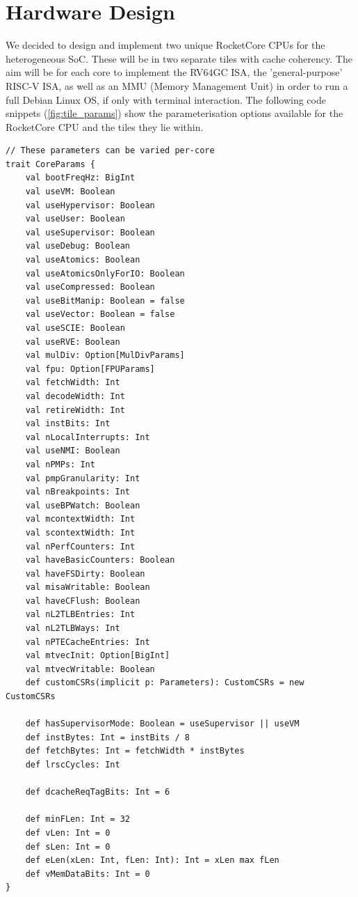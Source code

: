 \chapter{Hardware Design}
\label{ch:hw_design}
We decided to design and implement two unique RocketCore CPUs for the heterogeneous SoC. These will be in two separate tiles with cache coherency. The aim will be for each core to implement the RV64GC ISA, the 'general-purpose' RISC-V ISA, as well as an MMU (Memory Management Unit) in order to run a full Debian Linux OS, if only with terminal interaction. The following code snippets (\ref{fig:tile_params}) show the parameterisation options available for the RocketCore CPU and the tiles they lie within.

\begin{verbatim}
// These parameters can be varied per-core
trait CoreParams {
    val bootFreqHz: BigInt
    val useVM: Boolean
    val useHypervisor: Boolean
    val useUser: Boolean
    val useSupervisor: Boolean
    val useDebug: Boolean
    val useAtomics: Boolean
    val useAtomicsOnlyForIO: Boolean
    val useCompressed: Boolean
    val useBitManip: Boolean = false
    val useVector: Boolean = false
    val useSCIE: Boolean
    val useRVE: Boolean
    val mulDiv: Option[MulDivParams]
    val fpu: Option[FPUParams]
    val fetchWidth: Int
    val decodeWidth: Int
    val retireWidth: Int
    val instBits: Int
    val nLocalInterrupts: Int
    val useNMI: Boolean
    val nPMPs: Int
    val pmpGranularity: Int
    val nBreakpoints: Int
    val useBPWatch: Boolean
    val mcontextWidth: Int
    val scontextWidth: Int
    val nPerfCounters: Int
    val haveBasicCounters: Boolean
    val haveFSDirty: Boolean
    val misaWritable: Boolean
    val haveCFlush: Boolean
    val nL2TLBEntries: Int
    val nL2TLBWays: Int
    val nPTECacheEntries: Int
    val mtvecInit: Option[BigInt]
    val mtvecWritable: Boolean
    def customCSRs(implicit p: Parameters): CustomCSRs = new CustomCSRs

    def hasSupervisorMode: Boolean = useSupervisor || useVM
    def instBytes: Int = instBits / 8
    def fetchBytes: Int = fetchWidth * instBytes
    def lrscCycles: Int

    def dcacheReqTagBits: Int = 6

    def minFLen: Int = 32
    def vLen: Int = 0
    def sLen: Int = 0
    def eLen(xLen: Int, fLen: Int): Int = xLen max fLen
    def vMemDataBits: Int = 0
}
\end{verbatim}

